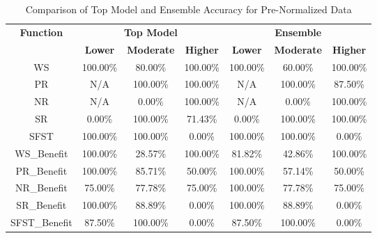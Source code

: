 \begin{table}[H]
\centering
\begin{tabular}{|c|c|c|c|c|c|c|}
\hline
\multirow{2}{*}{\textbf{Function}} & \multicolumn{3}{c|}{\textbf{Top Model}} & \multicolumn{3}{c|}{\textbf{Ensemble}} \\
\cline{2-7}
 & \textbf{Lower} & \textbf{Moderate} & \textbf{Higher} & \textbf{Lower} & \textbf{Moderate} & \textbf{Higher} \\
\hline
WS & 100.00\% & 80.00\% & 100.00\% & 100.00\% & 60.00\% & 100.00\% \\
\hline
PR & N/A & 100.00\% & 100.00\% & N/A & 100.00\% & 87.50\% \\
\hline
NR & N/A & 0.00\% & 100.00\% & N/A & 0.00\% & 100.00\% \\
\hline
SR & 0.00\% & 100.00\% & 71.43\% & 0.00\% & 100.00\% & 100.00\% \\
\hline
SFST & 100.00\% & 100.00\% & 0.00\% & 100.00\% & 100.00\% & 0.00\% \\
\hline
WS\_Benefit & 100.00\% & 28.57\% & 100.00\% & 81.82\% & 42.86\% & 100.00\% \\
\hline
PR\_Benefit & 100.00\% & 85.71\% & 50.00\% & 100.00\% & 57.14\% & 50.00\% \\
\hline
NR\_Benefit & 75.00\% & 77.78\% & 75.00\% & 100.00\% & 77.78\% & 75.00\% \\
\hline
SR\_Benefit & 100.00\% & 88.89\% & 0.00\% & 100.00\% & 88.89\% & 0.00\% \\
\hline
SFST\_Benefit & 87.50\% & 100.00\% & 0.00\% & 87.50\% & 100.00\% & 0.00\% \\
\hline
\end{tabular}
\caption{Comparison of Top Model and Ensemble Accuracy for Pre-Normalized Data}
\label{reg_all_tab:featred_norm_accuracy}
\end{table}
